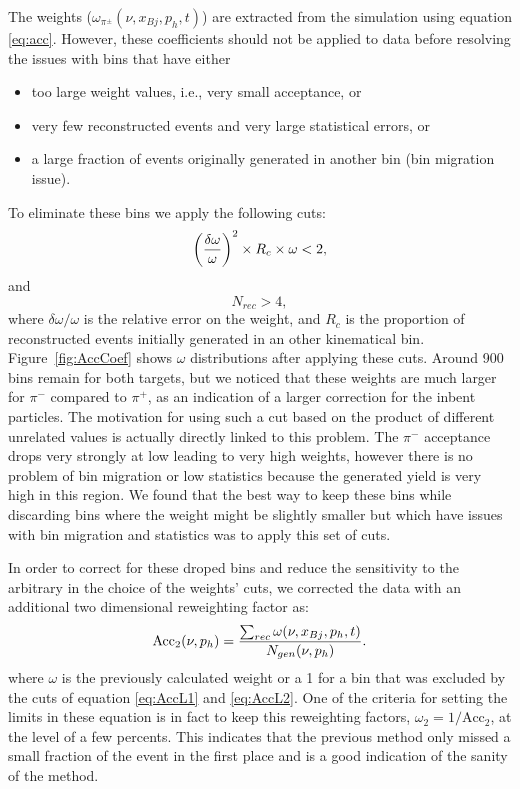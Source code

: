 The weights ($\omega_{\pi^\pm}(\nu,x_{Bj},p_h,t)$) are extracted from 
the simulation using equation \ref{eq:acc}. However, these coefficients should not be applied to data before resolving the issues with bins that have either
\begin{itemize}
 \item too large weight values, i.e., very small acceptance, or
 \item very few reconstructed events and very large statistical errors, or
 \item a large fraction of events originally generated in another bin (bin migration issue).
\end{itemize}
To eliminate these bins we apply the following cuts:
\begin{equation} \label{eq:AccL1}
\left ({\delta \omega \over \omega}\right ) ^2 \times R_c \times \omega < 2,
\end{equation}
and
\begin{equation} \label{eq:AccL2}
N_{rec} > 4,
\end{equation}
where $\delta \omega / \omega$ is the relative error on the weight, and $R_c$ is the 
proportion of reconstructed events initially generated in an other kinematical bin. 
Figure~\ref{fig:AccCoef} shows $\omega$ distributions after applying these cuts. Around 
900 bins remain for both targets, but we noticed that these weights are much larger for 
$\pi^-$ compared to $\pi^+$, as an indication of a larger correction for the inbent 
particles. The motivation for using such a cut based on the product of different unrelated
values is actually directly linked to this problem. The $\pi^-$ acceptance drops very 
strongly at low \pt leading to very high weights, however there is no problem of bin migration
or low statistics because the generated yield is very high in this region. We found that 
the best way
to keep these bins while discarding bins where the weight might be slightly smaller but which 
have issues with bin migration and statistics was to apply this set of cuts.

In order to correct for these droped bins and reduce the sensitivity to the arbitrary in
the choice of the weights' cuts, we corrected the data with an additional two dimensional 
reweighting factor as:
\begin{equation}
\text{Acc}_2(\nu,p_h) = {\sum_{rec} \omega (\nu,x_{Bj},p_h,t)\over N_{gen}(\nu,p_h)}.
\end{equation}
where $\omega$ is the previously calculated weight or a 1 for a bin that was excluded by the 
cuts of equation \ref{eq:AccL1} and \ref{eq:AccL2}. One of the criteria for setting the limits 
in these equation is in fact to keep this reweighting factors, $\omega_2 = 1/\text{Acc}_2$, at 
the level of a few percents. This indicates that the previous method only missed a small 
fraction of the event in the first place and is a good indication of the sanity of the method.

